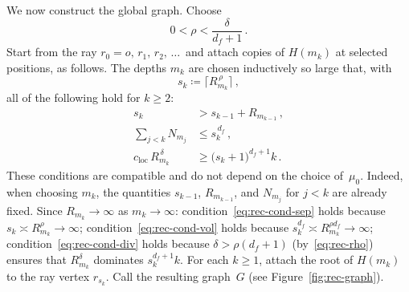 \documentclass[aop]{imsart}
\theoremstyle{plain}
\theoremstyle{definition}
\begin{document}
	We now construct the global graph.  Choose
	\begin{equation}\label{eq:rec-rho}
		0<\rho<\frac{\delta}{d_f+1}\,.
	\end{equation}
	Start from the ray $r_0{=}o,\,r_1,\,r_2,\,\ldots\,$ and attach copies of $H(m_k)$ at selected positions, as follows.
	The depths $m_k$ are chosen inductively so large that, with
	\begin{equation}\label{eq:rec-sk}
		s_k\coloneqq\bigl\lceil R_{m_k}^{\,\rho}\bigr\rceil\,,
	\end{equation}
	all of the following hold for $k\geq 2$:
	\begin{align}
		s_k&>s_{k-1}+R_{m_{k-1}}\,,
		\label{eq:rec-cond-sep}\\
		\sum_{j<k}N_{m_j}&\leq s_k^{\,d_f}\,,
		\label{eq:rec-cond-vol}\\
		c_{\mathrm{loc}}\,R_{m_k}^{\,\delta}
		&\geq \bigl(s_k{+}1\bigr)^{d_f+1} k\,.\label{eq:rec-cond-div}
	\end{align}
	These conditions are compatible and do not depend on the choice of~$\mu_0$.  Indeed, when choosing $m_k$, the quantities $s_{k-1}$, $R_{m_{k-1}}$, and $N_{m_j}$ for $j<k$ are already fixed.  Since $R_{m_k}\to\infty$ as $m_k\to\infty$: condition~\eqref{eq:rec-cond-sep} holds because $s_k\asymp R_{m_k}^{\rho}\to\infty$; condition~\eqref{eq:rec-cond-vol} holds because $s_k^{d_f}\asymp R_{m_k}^{\rho d_f} \to\infty$; condition~\eqref{eq:rec-cond-div} holds because $\delta>\rho(d_f{+}1)$ (by~\eqref{eq:rec-rho}) ensures that $R_{m_k}^{\delta}$ dominates $s_k^{d_f+1} k$. For each $k\geq 1$, attach the root of $H(m_k)$ to the ray vertex $r_{s_k}$.  Call the resulting graph~$G$ (see Figure~\ref{fig:rec-graph}).
	
\end{document}
